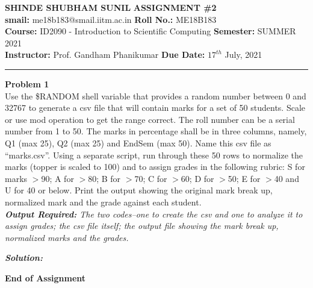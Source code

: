 \documentclass[a4paper, 11pt]{article}
\newenvironment{problem}[2][Problem]
    { \begin{mdframed}[backgroundcolor=gray!20] \textbf{#1 #2} \\}
    {  \end{mdframed}}
\newenvironment{solution}
    {\textbf{\textit{Solution:}}}
    {}
\begin{document}
\noindent
\large\textbf{SHINDE SHUBHAM SUNIL} \hfill \textbf{ASSIGNMENT \#2}   \\
\textbf{smail:} me18b183@smail.iitm.ac.in \hfill \textbf{Roll No.:} ME18B183 \\
\normalsize\textbf {Course:} ID2090 - Introduction to Scientific Computing \hfill \textbf{Semester:} SUMMER 2021 \\
\textbf{Instructor:} Prof. Gandham Phanikumar \hfill \textbf{Due Date:} $17^{th}$ July, 2021 \\
\noindent\rule{7in}{2.5pt}
\begin{problem}{1}
Use the \$RANDOM shell variable that provides a random number between 0 and 32767 to generate a csv file that will contain marks for a set of 50 students. Scale or use mod operation to get the range correct. The roll number can be a serial number from 1 to 50. The marks in percentage shall be in three columns, namely, Q1 (max 25), Q2 (max 25) and EndSem (max 50). Name this csv file as “marks.csv”. Using a separate script, run through these 50 rows to normalize the marks (topper is scaled to 100) and to assign grades in the following rubric: S for marks $>$90; A for $>$80; B for $>$70; C for $>$60; D for $>$50; E for $>$40 and U for 40 or below. Print the output showing the original mark break up, normalized mark and the grade against each student.\\
\textit{\textbf{Output Required:} The two codes–one to create the csv and one to analyze it to assign grades; the csv file itself; the output file showing the mark break up, normalized marks and the grades.}
\end{problem}
\begin{solution}


\end{solution} 


{\huge \centerline{\ast \ast \textbf{End of Assignment} \ast \ast}}
\\
\end{document}
